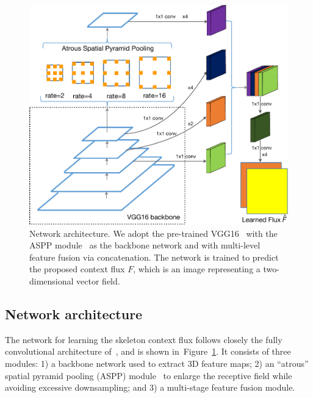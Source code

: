 \documentclass[10pt,twocolumn,letterpaper]{article}
\newcommand{\reffig}[1]{Figure~\ref{#1}}
\begin{document}
\begin{figure}
\centering
\includegraphics[width=0.93\linewidth]{figures/architecture_crop.pdf}
\vskip 0.2cm
\caption{Network architecture. We adopt the pre-trained VGG16~\cite{vgg16network} with the ASPP module~\cite{chen2018deeplab} as the backbone network and with multi-level feature fusion via concatenation. The network is trained to predict the proposed context flux $F$, which is an image representing a two-dimensional vector field.}
\label{fig:networkarchitecture}
\end{figure}

\subsection{Network architecture} \label{sec:networkarchitecture}
The network for learning the skeleton context flux follows  closely the fully convolutional architecture of~\cite{long2015fcn}, and is shown in~\reffig{fig:networkarchitecture}.
It consists of three modules:
1) a backbone network used to extract 3D feature maps;
2) an ``atrous'' spatial pyramid pooling (ASPP) module~\cite{chen2018deeplab} to enlarge the receptive field while avoiding excessive downsampling; and
3) a multi-stage feature fusion module.
\end{document}
